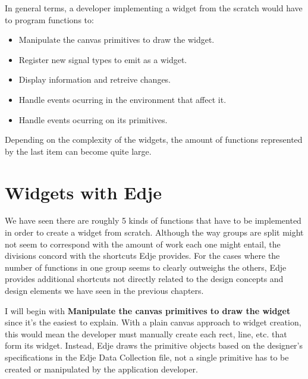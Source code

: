 \documentclass[12pt,a4paper,english]{book}
\begin{document}
In general terms, a developer implementing a widget from the scratch would have
to program functions to:
\begin{itemize}
\item {} 
Manipulate the canvas primitives to draw the widget.

\item {} 
Register new signal types to emit as a widget.

\item {} 
Display information and retreive changes.

\item {} 
Handle events ocurring in the environment that affect it.

\item {} 
Handle events ocurring on its primitives.

\end{itemize}

Depending on the complexity of the widgets, the amount of functions represented
by the last item can become quite large.



\hypertarget{widgets-with-edje}{}
\section{Widgets with Edje}
\label{widgets-with-edje}

We have seen there are roughly 5 kinds of functions that have to be implemented
in order to create a widget from scratch. Although the way groups are split
might not seem to correspond with the amount of work each one might entail, the
divisions concord with the shortcuts Edje provides. For the cases where
the number of functions in one group seems to clearly outweighs the others,
Edje provides additional shortcuts not directly related to the design concepts
and design elements we have seen in the previous chapters.

I will begin with \textbf{Manipulate the canvas primitives to draw the widget} since
it's the easiest to explain. With a plain canvas approach to widget creation,
this would mean the developer must manually create each rect, line, etc. that
form its widget. Instead, Edje draws the primitive objects based on the
designer's  specifications in the Edje Data Collection file, not a single
primitive has to be created or manipulated by the application developer.
\end{document}
